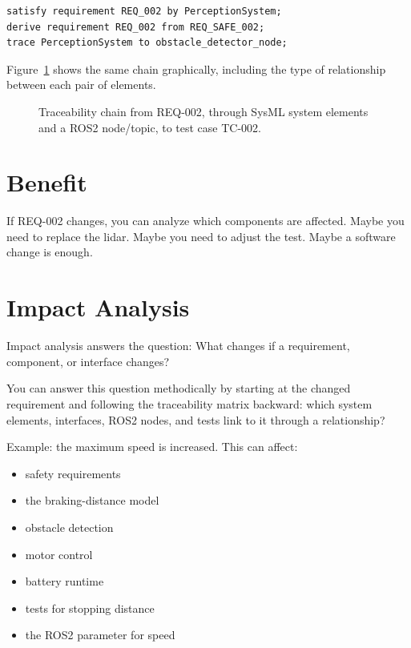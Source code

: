 \begin{lstlisting}
satisfy requirement REQ_002 by PerceptionSystem;
derive requirement REQ_002 from REQ_SAFE_002;
trace PerceptionSystem to obstacle_detector_node;
\end{lstlisting}

Figure~\ref{fig:kap20-traceability-kette-req002} shows the same chain graphically, including the type of relationship between each pair of elements.

\begin{figure}[H]
  \centering
  \caption{Traceability chain from REQ-002, through SysML system elements and a ROS2 node/topic, to test case TC-002.}
  \label{fig:kap20-traceability-kette-req002}
\end{figure}

\section{Benefit}
If REQ-002 changes, you can analyze which components are affected. Maybe you need to replace the lidar. Maybe you need to adjust the test. Maybe a software change is enough.

\section{Impact Analysis}
Impact analysis answers the question: What changes if a requirement, component, or interface changes?

You can answer this question methodically by starting at the changed requirement and following the traceability matrix backward: which system elements, interfaces, ROS2 nodes, and tests link to it through a relationship?

Example: the maximum speed is increased. This can affect:

\begin{itemize}
    \item safety requirements
    \item the braking-distance model
    \item obstacle detection
    \item motor control
    \item battery runtime
    \item tests for stopping distance
    \item the ROS2 parameter for speed
\end{itemize}

